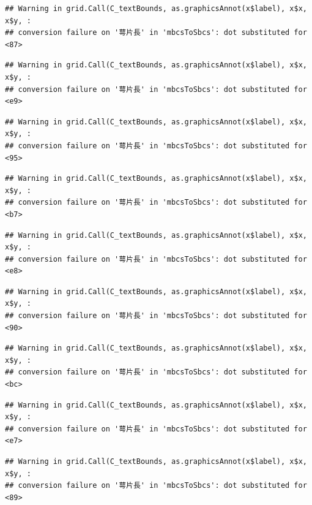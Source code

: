 \documentclass[
]{book}
\begin{document}
\begin{verbatim}
## Warning in grid.Call(C_textBounds, as.graphicsAnnot(x$label), x$x, x$y, :
## conversion failure on '萼片長' in 'mbcsToSbcs': dot substituted for <87>
\end{verbatim}

\begin{verbatim}
## Warning in grid.Call(C_textBounds, as.graphicsAnnot(x$label), x$x, x$y, :
## conversion failure on '萼片長' in 'mbcsToSbcs': dot substituted for <e9>
\end{verbatim}

\begin{verbatim}
## Warning in grid.Call(C_textBounds, as.graphicsAnnot(x$label), x$x, x$y, :
## conversion failure on '萼片長' in 'mbcsToSbcs': dot substituted for <95>
\end{verbatim}

\begin{verbatim}
## Warning in grid.Call(C_textBounds, as.graphicsAnnot(x$label), x$x, x$y, :
## conversion failure on '萼片長' in 'mbcsToSbcs': dot substituted for <b7>
\end{verbatim}

\begin{verbatim}
## Warning in grid.Call(C_textBounds, as.graphicsAnnot(x$label), x$x, x$y, :
## conversion failure on '萼片長' in 'mbcsToSbcs': dot substituted for <e8>
\end{verbatim}

\begin{verbatim}
## Warning in grid.Call(C_textBounds, as.graphicsAnnot(x$label), x$x, x$y, :
## conversion failure on '萼片長' in 'mbcsToSbcs': dot substituted for <90>
\end{verbatim}

\begin{verbatim}
## Warning in grid.Call(C_textBounds, as.graphicsAnnot(x$label), x$x, x$y, :
## conversion failure on '萼片長' in 'mbcsToSbcs': dot substituted for <bc>
\end{verbatim}

\begin{verbatim}
## Warning in grid.Call(C_textBounds, as.graphicsAnnot(x$label), x$x, x$y, :
## conversion failure on '萼片長' in 'mbcsToSbcs': dot substituted for <e7>
\end{verbatim}

\begin{verbatim}
## Warning in grid.Call(C_textBounds, as.graphicsAnnot(x$label), x$x, x$y, :
## conversion failure on '萼片長' in 'mbcsToSbcs': dot substituted for <89>
\end{verbatim}
\end{document}
